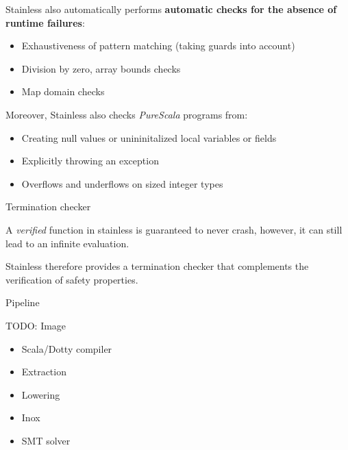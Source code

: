 \documentclass[
  ignorenonframetext,
]{beamer}
\providecommand{\tightlist}{%
  \setlength{\itemsep}{0pt}\setlength{\parskip}{0pt}}
\begin{document}
\begin{frame}

Stainless also automatically performs \textbf{automatic checks for the
absence of runtime failures}:

\begin{itemize}
\tightlist
\item
  Exhaustiveness of pattern matching (taking guards into account)
\item
  Division by zero, array bounds checks
\item
  Map domain checks
\end{itemize}

\end{frame}

\begin{frame}

Moreover, Stainless also checks \emph{PureScala} programs from:

\begin{itemize}
\tightlist
\item
  Creating null values or unininitalized local variables or fields
\item
  Explicitly throwing an exception
\item
  Overflows and underflows on sized integer types
\end{itemize}

\end{frame}

\begin{frame}{Termination checker}
\protect\hypertarget{termination-checker}{}

A \emph{verified} function in stainless is guaranteed to never crash,
however, it can still lead to an infinite evaluation.

Stainless therefore provides a termination checker that complements the
verification of safety properties.

\end{frame}

\begin{frame}{Pipeline}
\protect\hypertarget{pipeline}{}

TODO: Image

\begin{itemize}
\tightlist
\item
  Scala/Dotty compiler
\item
  Extraction
\item
  Lowering
\item
  Inox
\item
  SMT solver
\end{itemize}

\end{frame}
\end{document}
